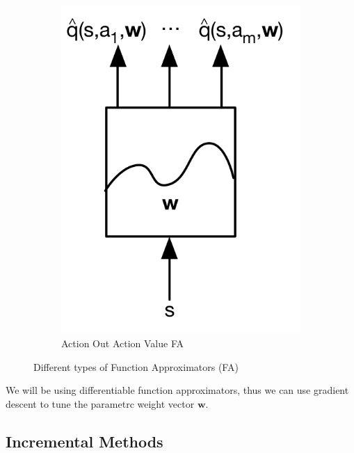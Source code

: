 \begin{figure}[H]
\begin{subfigure}[b]{0.3\textwidth}
        \includegraphics[width=\textwidth]{figures/fa-aout.png}
        \caption{Action Out Action Value FA}
        \label{fig:faaout}
    \end{subfigure}
    \caption{Different types of Function Approximators (FA)}
\end{figure}
We will be using differentiable function approximators, thus we can use gradient descent
to tune the parametrc weight vector \(\mathbf{w}\).

\subsection{Incremental Methods}

